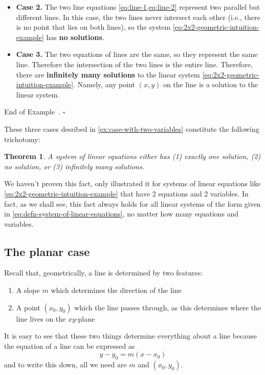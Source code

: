 \documentclass[10pt]{article}
\newtheorem{theorem}{Theorem}
\theoremstyle{definition}
\newtheorem{example}[theorem]{Example}
\renewenvironment{example}
{\begin{oldexample}}
  {\par\smallskip\hfill   End of Example~\theexample. $\square$    \par\end{oldexample}}
\begin{document}
\begin{example}[The case with two variables]
\begin{itemize}
    \item \textbf{Case 2.} The two line equations \cref{eq:line-1,eq:line-2}
    represent two parallel but different lines. In this case, the two lines
    never intersect each other (i.e., there is no point that lies on both
    lines), so the system \eqref{eq:2x2-geometric-intuition-example} has
    \textbf{no solutions}.
  
    \item \textbf{Case 3.} The two equations of lines are the same, so they
    represent the same line. Therefore the intersection of the two lines is
    the entire line. Therefore, there are \textbf{infinitely many solutions}
    to the linear system \eqref{eq:2x2-geometric-intuition-example}. Namely,
    any point $(x,y)$ on the line is a solution to the linear system.
  \end{itemize}
\end{example}
These three cases desribed in \cref{ex:case-with-two-variables} constitute the
following trichotomy:

\begin{theorem}
  A system of linear equations either has (1) exactly one
  solution, (2) no solution, or (3) infinitely many solutions.
\end{theorem}

We haven't proven this fact, only illustrated it for systems of linear
equations like \eqref{eq:2x2-geometric-intuition-example} that have 2
equations and 2 variables. In fact, as we shall see, this fact always holds
for all linear systems of the form given in
\eqref{eq:defn-system-of-linear-equations}, no matter how many equations and
variables.

\subsection{The planar case}
Recall that, geometrically, a line is determined by two features:
\begin{enumerate}
  \item A slope $m$ which determines the direction of the line
  \item A point $(x_{0},y_{0})$ which the line passes through, as this
  determines where the line lives on the $xy$-plane
\end{enumerate}
It is easy to see that these two things determine everything about a line
because the equation of a line can be expressed as
\begin{equation*}
  y-y_{0} = m(x-x_{0})
\end{equation*}
and to write this down, all we need are $m$ and $(x_{0},y_{0}).$
\end{document}
